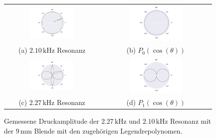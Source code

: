\begin{figure}[H]
  \centering
  \begin{tabular}{cc}
    \includegraphics[width=0.5\textwidth]{Daten/Wasserstoff/neu/peak9mm1.pdf} &   \includegraphics[width=0.5\textwidth]{Daten/Wasserstoffmolekuelion/peakLeg.pdf} \\
  (a) $2.10 \,\si{\kilo\hertz}$ Resonanz & (b) $P_0(\cos(\theta))$ \\[6pt]
  \includegraphics[width=0.5\textwidth]{Daten/Wasserstoff/neu/peak9mm.pdf} &   \includegraphics[width=0.5\textwidth]{Daten/Wasserstoff/peakLeg0.pdf} \\
  (c) $2.27 \,\si{\kilo\hertz}$ Resonanz & (d) $P_1(\cos(\theta))$ \\[6pt]
  \end{tabular}
  \caption{Gemessene Druckamplitude der $2.27 \,\si{\kilo\hertz}$ und $2.10 \,\si{\kilo\hertz}$ Resonanz mit der $9 \,\si{\milli\metre}$ Blende mit den zugehörigen Legendrepolynomen.} 
  \label{fig:9mm}
\end{figure}
